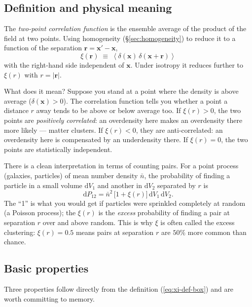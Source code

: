 \documentclass[12pt]{article}
\newcommand{\bx}{\mathbf{x}}
\newcommand{\br}{\mathbf{r}}
\newcommand{\avg}[1]{\left\langle #1 \right\rangle}
\begin{document}
\subsection{Definition and physical meaning}
\label{sec:xi-def}

The \emph{two-point correlation function} is the ensemble average of the
product of the field at two points.  Using homogeneity
(\S\ref{sec:homogeneity}) to reduce it to a function of the separation
$\br = \bx' - \bx$,
\begin{equation}
  \boxed{\;\xi(\br) \;\equiv\; \avg{\delta(\bx)\,\delta(\bx+\br)}\;}
  \label{eq:xi-def-box}
\end{equation}
with the right-hand side independent of $\bx$.  Under isotropy it
reduces further to $\xi(r)$ with $r = |\br|$.

What does it mean?  Suppose you stand at a point where the density is
above average ($\delta(\bx) > 0$).  The correlation function tells you
whether a point a distance $r$ away tends to be above or below average
too.  If $\xi(r) > 0$, the two points are \emph{positively correlated}:
an overdensity here makes an overdensity there more likely --- matter
clusters.  If $\xi(r) < 0$, they are anti-correlated: an overdensity
here is compensated by an underdensity there.  If $\xi(r) = 0$, the two
points are statistically independent.

There is a clean interpretation in terms of counting pairs.  For a
point process (galaxies, particles) of mean number density $\bar n$, the
probability of finding a particle in a small volume $\mathrm dV_1$ and
another in $\mathrm dV_2$ separated by $r$ is
\begin{equation}
  \mathrm dP_{12} = \bar n^2\,\bigl[1 + \xi(r)\bigr]\,\mathrm dV_1\,\mathrm dV_2 .
  \label{eq:xi-pair}
\end{equation}
The ``1'' is what you would get if particles were sprinkled completely
at random (a Poisson process); the $\xi(r)$ is the \emph{excess}
probability of finding a pair at separation $r$ over and above random.
This is why $\xi$ is often called the excess clustering: $\xi(r) = 0.5$
means pairs at separation $r$ are $50\%$ more common than chance.

\subsection{Basic properties}
\label{sec:xi-props}

Three properties follow directly from the definition
(\ref{eq:xi-def-box}) and are worth committing to memory.
\end{document}
